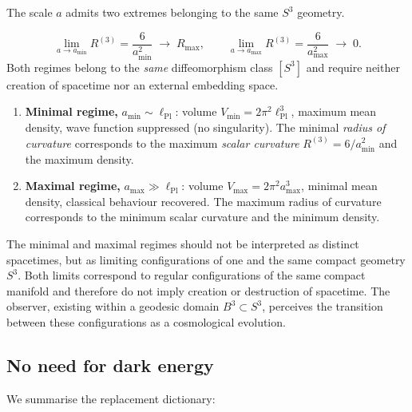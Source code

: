 \documentclass[12pt,a4paper]{article}
\theoremstyle{plain}
\theoremstyle{definition}
\newcommand{\lpl}{\ell_{\mathrm{Pl}}}
\begin{document}
The scale $a$ admits two extremes belonging to the same $S^3$ geometry.

\begin{keybox}
\begin{equation}
  \lim_{a\to a_{\min}} R^{(3)} = \frac{6}{a_{\min}^2}
  \;\to\; R_{\max},
  \qquad
  \lim_{a\to a_{\max}} R^{(3)} = \frac{6}{a_{\max}^2}
  \;\to\; 0.
  \label{eq:limiting_regimes}
\end{equation}
Both regimes belong to the \emph{same} diffeomorphism class $[S^3]$
and require neither creation of spacetime nor an external
embedding space.
\end{keybox}

\begin{enumerate}[label=$\bullet$]
  \item \textbf{Minimal regime,} $a_{\min}\sim\lpl$:
        volume $V_{\min} = 2\pi^2\lpl^3$, maximum mean density,
        wave function suppressed (no singularity).
        The minimal \emph{radius of curvature} corresponds to the
        maximum \emph{scalar curvature} $R^{(3)} = 6/a_{\min}^2$
        and the maximum density.
  \item \textbf{Maximal regime,} $a_{\max}\gg\lpl$:
        volume $V_{\max} = 2\pi^2 a_{\max}^3$, minimal mean density,
        classical behaviour recovered.
        The maximum radius of curvature corresponds to the minimum
        scalar curvature and the minimum density.
\end{enumerate}

The minimal and maximal regimes should not be interpreted as distinct
spacetimes, but as limiting configurations of one and the same compact
geometry $S^3$. Both limits correspond to regular configurations of the
same compact manifold and therefore do not imply creation or destruction
of spacetime. The observer, existing within a geodesic domain
$B^3\subset S^3$, perceives the transition between these configurations
as a cosmological evolution.

\subsection{No need for dark energy}

We summarise the replacement dictionary:
\end{document}
